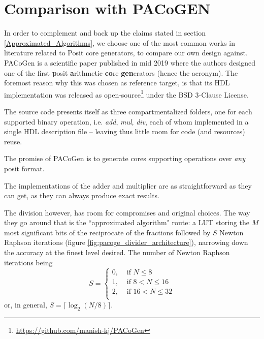 \section{Comparison with PACoGEN}

In order to complement and back up the claims stated in section \ref{Approximated_Algorithms}, we choose one of the most common works in literature related to Posit core generators, to compare our own design against.
PACoGen \cite{PACoGen} is a scientific paper published in mid 2019 where the authors designed one of the first \textbf{p}osit \textbf{a}rithmetic \textbf{co}re \textbf{gen}erators (hence the acronym). The foremost reason why this was chosen as reference target, is that its HDL implementation was released as open-source\footnote{\url{https://github.com/manish-kj/PACoGen}} under the BSD 3-Clause License.


The source code presents itself as three compartmentalized folders, one for each supported binary operation, i.e. \textit{add}, \textit{mul}, \textit{div}, each of whom implemented in a single HDL description file -- leaving thus little room for code (and resources) reuse.

The promise of PACoGen is to generate cores supporting operations over \textit{any} posit format.

The implementations of the adder and multiplier are as straightforward as they can get, as they can always produce exact results.

 The division however, has room for compromises and original choices. The way they go around that is the ``approximated algorithm" route: a  LUT storing the $M$ most significant bits of the reciprocate of the fractions followed by $S$ Newton Raphson iterations (figure \ref{fig:pacoge_divider_architecture}), narrowing down the accuracy at the finest level desired. The number of Newton Raphson iterations being
    \begin{equation*}\label{equ:regime_k_equation}
        S = \begin{cases}
        0, &\text{ if } N \le 8 \\
        1, &\text{ if } 8 < N \leq 16 \\
        2, &\text{ if } 16 < N \le 32 \\
        \end{cases}
    \end{equation*}
    or, in general, $S = \lceil \log_2(N / 8) \rceil$.

